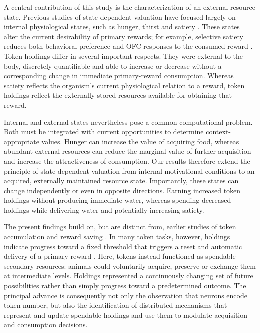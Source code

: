 \documentclass[pdflatex,sn-mathphys-num]{sn-jnl}%
\begin{document}
A central contribution of this study is the characterization of an external resource state. Previous studies of state-dependent valuation have focused largely on internal physiological states, such as hunger, thirst and satiety \citep{piech2009appetite,dearaujo2003water,murray2018specializations}. These states alter the current desirability of primary rewards; for example, selective satiety reduces both behavioral preference and OFC responses to the consumed reward \citep{rolls1989hunger,pastorbernier2021satiety}. Token holdings differ in several important respects. They were external to the body, discretely quantifiable and able to increase or decrease without a corresponding change in immediate primary-reward consumption. Whereas satiety reflects the organism’s current physiological relation to a reward, token holdings reflect the externally stored resources available for obtaining that reward.

Internal and external states nevertheless pose a common computational problem. Both must be integrated with current opportunities to determine context-appropriate values. Hunger can increase the value of acquiring food, whereas abundant external resources can reduce the marginal value of further acquisition and increase the attractiveness of consumption. Our results therefore extend the principle of state-dependent valuation from internal motivational conditions to an acquired, externally maintained resource state. Importantly, these states can change independently or even in opposite directions. Earning increased token holdings without producing immediate water, whereas spending decreased holdings while delivering water and potentially increasing satiety.

The present findings build on, but are distinct from, earlier studies of token accumulation and reward saving \citep{seo2009behavioral,yangPrimateAnteriorInsular2022c,ferroAccumulationVirtualTokens2025a,nguyenNeuralRepresentationDecisional2025a,hernadi2015planning}. In many token tasks, however, holdings indicate progress toward a fixed threshold that triggers a reset and automatic delivery of a primary reward \citep{seo2009behavioral,ferroAccumulationVirtualTokens2025a}. Here, tokens instead functioned as spendable secondary resources: animals could voluntarily acquire, preserve or exchange them at intermediate levels. Holdings represented a continuously changing set of future possibilities rather than simply progress toward a predetermined outcome. The principal advance is consequently not only the observation that neurons encode token number, but also the identification of distributed mechanisms that represent and update spendable holdings and use them to modulate acquisition and consumption decisions.
\end{document}
